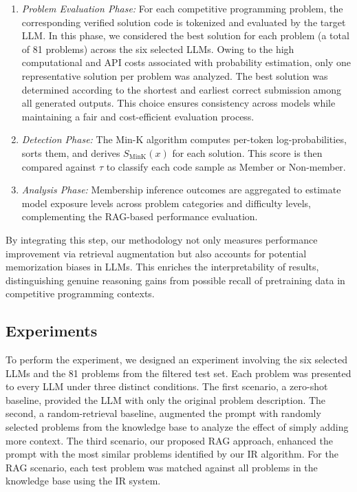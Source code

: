 \documentclass[preprint,12pt]{elsarticle}
\begin{document}
\begin{enumerate}
   

    \item \textit{Problem Evaluation Phase:} For each competitive programming problem, the corresponding verified solution code is tokenized and evaluated by the target LLM. In this phase, we considered the best solution for each problem (a total of 81 problems) across the six selected LLMs. Owing to the high computational and API costs associated with probability estimation, only one representative solution per problem was analyzed. The best solution was determined according to the shortest and earliest correct submission among all generated outputs. This choice ensures consistency across models while maintaining a fair and cost-efficient evaluation process.
    
    \item \textit{Detection Phase:} The Min-K algorithm computes per-token log-probabilities, sorts them, and derives \( S_{\text{MinK}}(x) \) for each solution. This score is then compared against \( \tau \) to classify each code sample as Member or Non-member.
    
    \item \textit{Analysis Phase:} Membership inference outcomes are aggregated to estimate model exposure levels across problem categories and difficulty levels, complementing the RAG-based performance evaluation.
    
\end{enumerate}

By integrating this step, our methodology not only measures performance improvement via retrieval augmentation but also accounts for potential memorization biases in LLMs. This enriches the interpretability of results, distinguishing genuine reasoning gains from possible recall of pretraining data in competitive programming contexts.


\subsection{Experiments}
\label{subsec:experiments}

To perform the experiment, we designed an experiment involving the six selected LLMs and the 81 problems from the filtered test set. Each problem was presented to every LLM under three distinct conditions. The first scenario, a zero-shot baseline, provided the LLM with only the original problem description. The second, a random-retrieval baseline, augmented the prompt with randomly selected problems from the knowledge base to analyze the effect of simply adding more context. The third scenario, our proposed RAG approach, enhanced the prompt with the most similar problems identified by our IR algorithm. For the RAG scenario, each test problem was matched against all problems in the knowledge base using the IR system.
\end{document}

